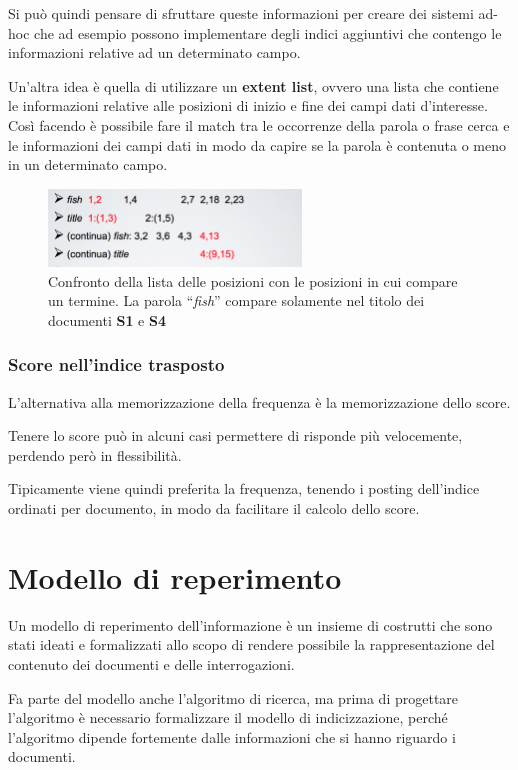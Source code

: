 Si può quindi pensare di sfruttare queste informazioni per creare dei sistemi ad-hoc che ad esempio possono implementare degli indici aggiuntivi che contengo le informazioni relative ad un determinato campo.

Un'altra idea è quella di utilizzare un \textbf{extent list}, ovvero una lista che contiene le informazioni relative alle posizioni di inizio e fine dei campi dati d'interesse.
Così facendo è possibile fare il match tra le occorrenze della parola o frase cerca e le informazioni dei campi dati in modo da capire se la parola è contenuta o meno in un determinato campo.

\begin{figure}[htbp]
	\centering
	\includegraphics[width=0.6\textwidth]{./images/l7-titoli}
	\caption{Confronto della lista delle posizioni con le posizioni in cui compare un termine. La parola ``\textit{fish}'' compare solamente nel titolo dei documenti \textbf{S1} e \textbf{S4}}
\end{figure}

\subsection{Score nell'indice trasposto}

L'alternativa alla memorizzazione della frequenza è la memorizzazione dello score. 

Tenere lo score può in alcuni casi permettere di risponde più velocemente, perdendo però in flessibilità.

Tipicamente viene quindi preferita la frequenza, tenendo i posting dell'indice ordinati per documento, in modo da facilitare il calcolo dello score.

\chapter{Modello di reperimento}

Un modello di reperimento dell'informazione è un insieme di costrutti che sono stati ideati e formalizzati allo scopo di rendere possibile la rappresentazione del contenuto dei documenti e delle interrogazioni.

Fa parte del modello anche l'algoritmo di ricerca, ma prima di progettare l'algoritmo è necessario formalizzare il modello di indicizzazione, perché l'algoritmo dipende fortemente dalle informazioni che si hanno riguardo i documenti.

